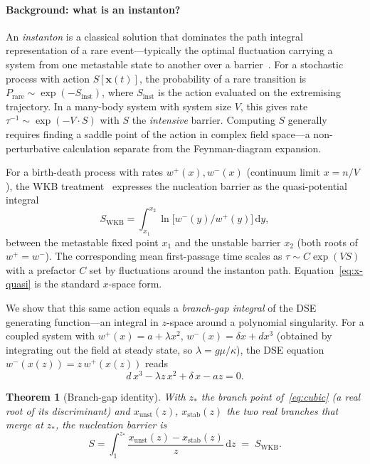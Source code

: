 \documentclass[11pt,a4paper]{article}
\newcommand{\dd}{\mathrm{d}}
\theoremstyle{plain}
\newtheorem{theorem}{Theorem}
\begin{document}
\paragraph{Background: what is an instanton?}
An \emph{instanton} is a classical solution that dominates the
path integral representation of a rare event---typically the
optimal fluctuation carrying a system from one metastable state
to another over a barrier~\cite{LangerNucleation,Tauber}.  For a
stochastic process with action $S[\mathbf{x}(t)]$, the
probability of a rare transition is
$P_{\mathrm{rare}} \sim \exp(-S_{\mathrm{inst}})$, where
$S_{\mathrm{inst}}$ is the action evaluated on the extremising
trajectory.  In a many-body system with system size $V$, this
gives rate $\tau^{-1} \sim \exp(-V\cdot S)$ with $S$ the
\emph{intensive} barrier.  Computing $S$ generally requires
finding a saddle point of the action in complex field space---a
non-perturbative calculation separate from the Feynman-diagram
expansion.

For a birth-death process with rates $w^+(x), w^-(x)$ (continuum
limit $x = n/V$), the WKB
treatment~\cite{ElgartKamenev,Meerson,DykmanRoss,LangerNucleation}
expresses the nucleation barrier as the quasi-potential integral
\begin{equation}\label{eq:x-quasi}
  S_{\mathrm{WKB}}
  = \int_{x_1}^{x_2}\!\ln\bigl[w^-(y)/w^+(y)\bigr]\,\dd y,
\end{equation}
between the metastable fixed point $x_1$ and the unstable
barrier $x_2$ (both roots of $w^+ = w^-$).  The corresponding
mean first-passage time scales as $\tau \sim C\exp(V S)$ with a
prefactor $C$ set by fluctuations around the instanton path.
Equation~\eqref{eq:x-quasi} is the standard $x$-space form.

We show that this same action equals a \emph{branch-gap
integral} of the DSE generating function---an integral in
$z$-space around a polynomial singularity.  For a coupled system
with $w^+(x) = a + \lambda x^2$, $w^-(x) = \delta x + dx^3$
(obtained by integrating out the field at steady state, so
$\lambda = g\mu/\kappa$), the DSE equation
$w^-(x(z)) = z\,w^+(x(z))$ reads
\begin{equation}\label{eq:cubic}
  d\,x^3 - \lambda z\,x^2 + \delta\,x - a z = 0.
\end{equation}

\begin{theorem}[Branch-gap identity]
\label{thm:gap}
With $z_*$ the branch point of~\eqref{eq:cubic} (a real root of
its discriminant) and $x_{\mathrm{unst}}(z)$,
$x_{\mathrm{stab}}(z)$ the two real branches that merge at
$z_*$, the nucleation barrier is
\begin{equation}\label{eq:branch-gap}
  S = \int_1^{z_*}
    \frac{x_{\mathrm{unst}}(z) - x_{\mathrm{stab}}(z)}{z}\,\dd z
    \;=\; S_{\mathrm{WKB}}.
\end{equation}
\end{theorem}
\end{document}
